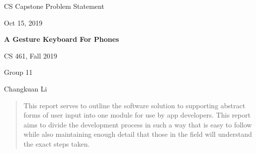 \documentclass[onecolumn, draftclsnofoot,10pt, compsoc]{IEEEtran}
\def \CapstoneClass{CS 461,  Fall 2019}
\def \CapstoneTeamNumber{   11}
\def \GroupMemberOne{Changkuan Li}
\def \CapstoneProjectName{A Gesture Keyboard For Phones}
\def \DocType{		Problem Statement
				}
\newcommand{\NameSigPair}[1]{\par
\makebox[2.75in][r]{#1} \hfil 	\makebox[3.25in]{\makebox[2.25in]{\hrulefill} \hfill		\makebox[.75in]{\hrulefill}}
\par\vspace{-12pt} \textit{\tiny\noindent
\makebox[2.75in]{} \hfil		\makebox[3.25in]{\makebox[2.25in][r]{Signature} \hfill	\makebox[.75in][r]{Date}}}}
\renewcommand{\NameSigPair}[1]{#1}
\begin{document}
\begin{titlepage}
    \begin{singlespace}
        \hfill 
        \par\vspace{.2in}
        \centering
        \scshape{
            \huge CS Capstone \DocType \par
            {\large{Oct 15, 2019}}\par
            \vspace{.5in}
            \textbf{\Huge\CapstoneProjectName}\par
            \vfill
            \vspace{5pt}
            \CapstoneClass\par
            Group\CapstoneTeamNumber\par
            \vspace{5pt}
            {\Large
                \NameSigPair{\GroupMemberOne}\par
            }
            \vspace{20pt}
        }
        \begin{abstract}
        	This report serves to outline the software solution to supporting abstract forms of user input into one module for use by app developers. This report aims to divide the development process in such a way that is easy to follow while also maintaining enough detail that those in the field will understand the exact steps taken.
        \end{abstract}     
    \end{singlespace}
\end{titlepage}
\newpage
{}
\end{document}
